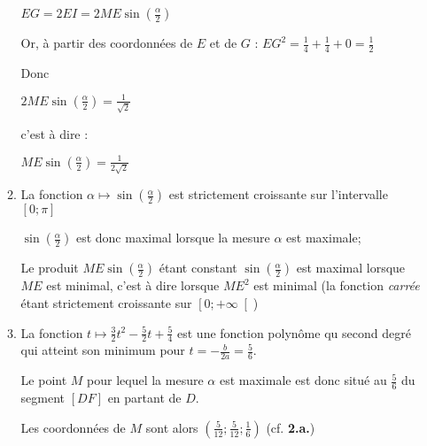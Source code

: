 \begin{corrige}
\begin{enumerate}
\begin{enumerate}[label=\alph*.]
                              $EG=2 EI=2 ME \sin\left(\frac{ \alpha}{2}\right)$
                              \par
                              Or, à partir des coordonnées de $E$ et de $G$ : $EG^{2}=\frac{1}{4}+\frac{1}{4}+0=\frac{1}{2}$
                              \par
                              Donc
                              \par
                              $2ME \sin \left(\frac{\alpha }{2}\right)=\frac{1}{\sqrt{2}}$
                              \par
                              c'est à dire :
                              \par
                              $ME \sin \left(\frac{\alpha }{2}\right)=\frac{1}{2\sqrt{2}}$
                              \item
                              La fonction $\alpha  \mapsto  \sin\left(\frac{\alpha}{2}\right)$ est strictement croissante sur l'intervalle $\left[0; \pi \right]$
                              \par
                              $\sin\left(\frac{\alpha}{2}\right)$ est donc maximal lorsque la mesure $\alpha $ est maximale;
                              \par
                              Le produit $ME \sin \left(\frac{\alpha }{2}\right)$ étant constant  $\sin \left(\frac{\alpha }{2}\right)$ est maximal lorsque $ME$ est minimal, c'est à dire lorsque $ME^{2}$ est minimal (la fonction \textit{carrée} étant strictement croissante sur $\left[0;+\infty \right[$)
                              \item
                              La fonction $t \mapsto  \frac{3}{2}t^{2}-\frac{5}{2}t+\frac{5}{4}$ est une fonction polynôme qu second degré qui atteint son minimum pour $t=-\frac{b}{2a}=\frac{5}{6}$.
                              \par
                              Le point $M$ pour lequel la mesure $\alpha $ est maximale est donc situé au $\frac{5}{6}$ du segment $\left[DF\right]$ en partant de $D$.
                              \par
                              Les coordonnées de $M$ sont alors $\left(\frac{5}{12};\frac{5}{12};\frac{1}{6}\right)$ (cf. \textbf{2.a.})
                         \end{enumerate}
                    \end{enumerate}
          \end{corrige}
